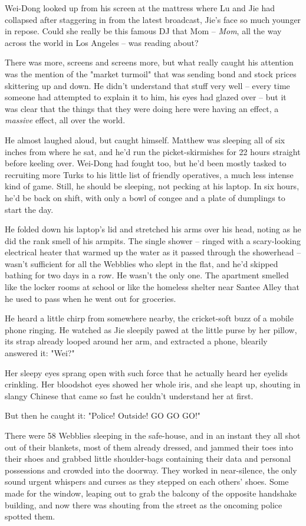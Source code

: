 Wei-Dong looked up from his screen at the mattress where Lu and Jie
had collapsed after staggering in from the latest broadcast, Jie's
face so much younger in repose. Could she really be this famous DJ
that Mom -- \emph{Mom}, all the way across the world in Los Angeles
-- was reading about?

There was more, screens and screens more, but what really caught
his attention was the mention of the "market turmoil" that was
sending bond and stock prices skittering up and down. He didn't
understand that stuff very well -- every time someone had attempted
to explain it to him, his eyes had glazed over -- but it was clear
that the things that they were doing here were having an effect, a
\emph{massive} effect, all over the world.

He almost laughed aloud, but caught himself. Matthew was sleeping
all of six inches from where he sat, and he'd run the
picket-skirmishes for 22 hours straight before keeling over.
Wei-Dong had fought too, but he'd been mostly tasked to recruiting
more Turks to his little list of friendly operatives, a much less
intense kind of game. Still, he should be sleeping, not pecking at
his laptop. In six hours, he'd be back on shift, with only a bowl
of congee and a plate of dumplings to start the day.

He folded down his laptop's lid and stretched his arms over his
head, noting as he did the rank smell of his armpits. The single
shower -- ringed with a scary-looking electrical heater that warmed
up the water as it passed through the showerhead -- wasn't
sufficient for all the Webblies who slept in the flat, and he'd
skipped bathing for two days in a row. He wasn't the only one. The
apartment smelled like the locker rooms at school or like the
homeless shelter near Santee Alley that he used to pass when he
went out for groceries.

He heard a little chirp from somewhere nearby, the cricket-soft
buzz of a mobile phone ringing. He watched as Jie sleepily pawed at
the little purse by her pillow, its strap already looped around her
arm, and extracted a phone, blearily answered it: "Wei?"

Her sleepy eyes sprang open with such force that he actually heard
her eyelids crinkling. Her bloodshot eyes showed her whole iris,
and she leapt up, shouting in slangy Chinese that came so fast he
couldn't understand her at first.

But then he caught it: "Police! Outside! GO GO GO!"

There were 58 Webblies sleeping in the safe-house, and in an
instant they all shot out of their blankets, most of them already
dressed, and jammed their toes into their shoes and grabbed little
shoulder-bags containing their data and personal possessions and
crowded into the doorway. They worked in near-silence, the only
sound urgent whispers and curses as they stepped on each others'
shoes. Some made for the window, leaping out to grab the balcony of
the opposite handshake building, and now there was shouting from
the street as the oncoming police spotted them.

